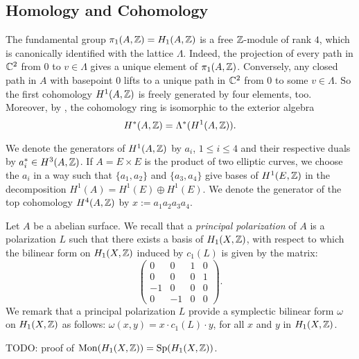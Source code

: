 \subsection{Homology and Cohomology}
The fundamental group $\pi_1(A,\mathbb{Z}) = H_1(A,\mathbb{Z})$ is a free $\mathbb{Z}$-module of rank $4$, which is canonically identified with the lattice $\Lambda$. Indeed, the projection of every path in $\mathbb{C}^2$ from $0$ to $v\in \Lambda$ gives a unique element of $\pi_1(A,\mathbb{Z})$. Conversely, any closed path in $A$ with basepoint $0$ lifts to a unique path in $\mathbb{C}^2$ from $0$ to some $v\in\Lambda$.
So the first cohomology $H^1(A,\mathbb{Z})$ is freely generated by four elements, too. Moreover, by \cite[Sect.~I.1]{Mumford}, the cohomology ring is isomorphic to the exterior algebra
$$
H^*(A,\mathbb{Z}) = \Lambda^*(H^1(A,\mathbb{Z})).
$$
\begin{notation} \label{TorusClasses}
We denote the generators of $H^1(A,\mathbb{Z})$ by $a_i$, $1\leq i\leq 4$ and their respective duals by $a_i^*\in H^3(A,\mathbb{Z})$. 
If $A=E\times E$ is the product of two elliptic curves, we choose the $a_i$ in a way such that $\{a_1,a_2\}$ and $\{a_3,a_4\}$ give bases of $H^1(E,\mathbb{Z})$ in the decomposition $H^1(A) = H^1(E)\oplus H^1(E)$.
We denote the generator of the top cohomology $H^4(A,\mathbb{Z})$ by $x := a_1 a_2 a_3 a_4$.
\end{notation}



Let $A$ be a abelian surface. We recall that a \emph{principal polarization} of $A$ is a polarization $L$ such that there exists a basis of $H_1(X,\mathbb{Z})$, with respect to which the bilinear form on $H_1(X,\mathbb{Z})$ induced by $c_1(L)$ is given by the matrix:
$$\left( {\begin{array}{cccc}
   0 & 0 & 1 & 0 \\    0 &  0 & 0 & 1\\ -1 & 0 & 0 & 0\\ 0 & -1 & 0 & 0     
   \end{array} } \right).$$
We remark that a principal polarization $L$ provide a symplectic bilinear form $\omega$ on $H_1(X,\mathbb{Z})$ as follows:
$\omega(x,y)=x\cdot c_1(L)\cdot y$, for all $x$ and $y$ in $H_1(X,\mathbb{Z})$.

TODO: proof of $\operatorname{Mon} (H_1(X,\mathbb{Z}))=\operatorname{Sp}(H_1(X,\mathbb{Z}))$.
